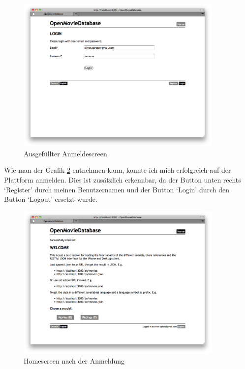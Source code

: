 \begin{figure}[ht]
    \begin{center}
        \includegraphics[width=0.9\textwidth,angle=0]{./bilder/tests/test_anmeldung_01.png}
        \caption{Ausgefüllter Anmeldescreen}
        \label{test_anmeldung_01}
    \end{center}
\end{figure}

Wie man der Grafik \ref{test_anmeldung_02} entnehmen kann, konnte ich mich
erfolgreich auf der Plattform anmelden. Dies ist zusätzlich erkennbar, da 
der Button unten rechts `Register' durch meinen Benutzernamen und der Button
`Login' durch den Button `Logout' ersetzt wurde.

\begin{figure}[ht]
    \begin{center}
        \includegraphics[width=0.9\textwidth,angle=0]{./bilder/tests/test_anmeldung_02.png}
        \caption{Homescreen nach der Anmeldung}
        \label{test_anmeldung_02}
    \end{center}
\end{figure}

